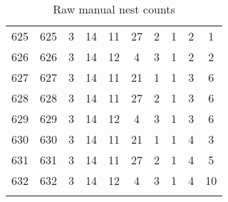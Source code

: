 \begin{longtable}{cccccccccc}
  625 & 625 &   3 &  14 &  11 &  27 &   2 &   1 &   2 &   1 \\ 
  626 & 626 &   3 &  14 &  12 &   4 &   3 &   1 &   2 &   2 \\ 
  627 & 627 &   3 &  14 &  11 &  21 &   1 &   1 &   3 &   6 \\ 
  628 & 628 &   3 &  14 &  11 &  27 &   2 &   1 &   3 &   6 \\ 
  629 & 629 &   3 &  14 &  12 &   4 &   3 &   1 &   3 &   6 \\ 
  630 & 630 &   3 &  14 &  11 &  21 &   1 &   1 &   4 &   3 \\ 
  631 & 631 &   3 &  14 &  11 &  27 &   2 &   1 &   4 &   5 \\ 
  632 & 632 &   3 &  14 &  12 &   4 &   3 &   1 &   4 &  10 \\ 
\bottomrule
\caption{Raw manual nest counts} %
\label{tab:rawdata-manualcounts}
\end{longtable}

\centering

